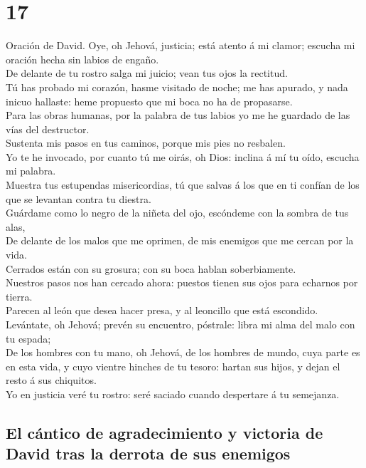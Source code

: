 \hypertarget{section-19-17}{%
\section{17}\label{section-19-17}}

 Oración de David. Oye, oh Jehová, justicia; está atento á
mi clamor; escucha mi oración hecha sin labios de engaño.\\
 De delante de tu rostro salga mi juicio; vean tus ojos la
rectitud.\\
 Tú has probado mi corazón, hasme visitado de noche; me
has apurado, y nada inicuo hallaste: heme propuesto que mi boca no ha de
propasarse.\\
 Para las obras humanas, por la palabra de tus labios yo
me he guardado de las vías del destructor.\\
 Sustenta mis pasos en tus caminos, porque mis pies no
resbalen.\\
 Yo te he invocado, por cuanto tú me oirás, oh Dios:
inclina á mí tu oído, escucha mi palabra.\\
 Muestra tus estupendas misericordias, tú que salvas á los
que en ti confían de los que se levantan contra tu diestra.\\
 Guárdame como lo negro de la niñeta del ojo, escóndeme
con la sombra de tus alas,\\
 De delante de los malos que me oprimen, de mis enemigos
que me cercan por la vida.\\
 Cerrados están con su grosura; con su boca hablan
soberbiamente.\\
 Nuestros pasos nos han cercado ahora: puestos tienen sus
ojos para echarnos por tierra.\\
 Parecen al león que desea hacer presa, y al leoncillo
que está escondido.\\
 Levántate, oh Jehová; prevén su encuentro, póstrale:
libra mi alma del malo con tu espada;\\
 De los hombres con tu mano, oh Jehová, de los hombres de
mundo, cuya parte es en esta vida, y cuyo vientre hinches de tu tesoro:
hartan sus hijos, y dejan el resto á sus chiquitos.\\
 Yo en justicia veré tu rostro: seré saciado cuando
despertare á tu semejanza.

\hypertarget{el-cuxe1ntico-de-agradecimiento-y-victoria-de-david-tras-la-derrota-de-sus-enemigos}{%
\subsection{El cántico de agradecimiento y victoria de David tras la
derrota de sus
enemigos}\label{el-cuxe1ntico-de-agradecimiento-y-victoria-de-david-tras-la-derrota-de-sus-enemigos}}

